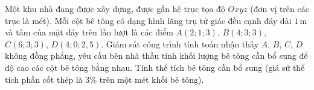 \begin{ex}%
	Một khu nhà đang được xây dựng, được gắn hệ trục tọa độ $Oxyz$ (đơn  vị trên các trục là mét). Mỗi cột bê tông có dạng hình lăng trụ tứ giác đều cạnh đáy dài $1$\,m và tâm của mặt đáy trên lần lượt là các điểm $A(2;1;3)$, $B(4;3;3)$, $C(6;3;3)$, $D(4;0;2{,}5)$. Giám sát công trình tính toán nhận thấy $A$, $B$, $C$, $D$ không đồng phẳng, yêu cầu bên nhà thầu tính khối lượng bê tông cần bổ sung để độ cao các cột bê tông bằng nhau. Tính thể tích bê tông cần bổ sung (giả sử thể tích phần cốt thép là $3\%$ trên một mét khối bê tông).
\end{ex}

